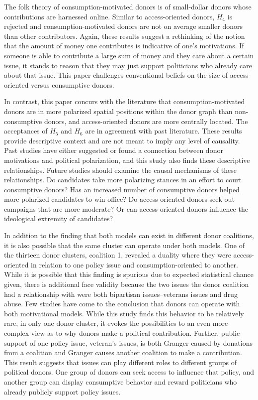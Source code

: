 \documentclass[12pt,]{article}
\begin{document}
The folk theory of consumption-motivated donors is of small-dollar
donors whose contributions are harnessed online. Similar to
access-oriented donors, \(H_{4}\) is rejected and consumption-motivated
donors are not on average smaller donors than other contributors. Again,
these results suggest a rethinking of the notion that the amount of
money one contributes is indicative of one's motivations. If someone is
able to contribute a large sum of money and they care about a certain
issue, it stands to reason that they may just support politicians who
already care about that issue. This paper challenges conventional
beliefs on the size of access-oriented versus consumptive donors.

In contrast, this paper concurs with the literature that
consumption-motivated donors are in more polarized spatial positions
within the donor graph than non-consumptive donors, and access-oriented
donors are more centrally located. The acceptances of \(H_{5}\) and
\(H_{6}\) are in agreement with past literature. These results provide
descriptive context and are not meant to imply any level of causality.
Past studies have either suggested or found a connection between donor
motivations and political polarization, and this study also finds these
descriptive relationships. Future studies should examine the causal
mechanisms of these relationships. Do candidates take more polarizing
stances in an effort to court consumptive donors? Has an increased
number of consumptive donors helped more polarized candidates to win
office? Do access-oriented donors seek out campaigns that are more
moderate? Or can access-oriented donors influence the ideological
extremity of candidates?

In addition to the finding that both models can exist in different donor
coalitions, it is also possible that the same cluster can operate under
both models. One of the thirteen donor clusters, coalition 1, revealed a
duality where they were access-oriented in relation to one policy issue
and consumption-oriented to another. While it is possible that this
finding is spurious due to expected statistical chance given, there is
additional face validity because the two issues the donor coalition had
a relationship with were both bipartisan issues--veterans issues and
drug abuse. Few studies have come to the conclusion that donors can
operate with both motivational models. While this study finds this
behavior to be relatively rare, in only one donor cluster, it evokes the
possibilities to an even more complex view as to why donors make a
political contribution. Further, public support of one policy issue,
veteran's issues, is both Granger caused by donations from a coalition
and Granger causes another coalition to make a contribution. This result
suggests that issues can play different roles to different groups of
political donors. One group of donors can seek access to influence that
policy, and another group can display consumptive behavior and reward
politicians who already publicly support policy issues.
\end{document}
